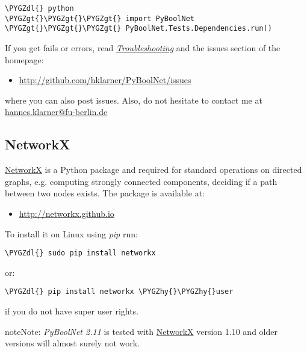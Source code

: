 \documentclass[letterpaper,10pt,english]{sphinxmanual}
\def\PYGZgt{\char`\>}
\def\PYGZdl{\char`\$}
\def\PYGZhy{\char`\-}
\begin{document}
\begin{Verbatim}[commandchars=\\\{\}]
\PYGZdl{} python
\PYGZgt{}\PYGZgt{}\PYGZgt{} import PyBoolNet
\PYGZgt{}\PYGZgt{}\PYGZgt{} PyBoolNet.Tests.Dependencies.run()
\end{Verbatim}

If you get fails or errors, read {\hyperref[Installation:installation-troubleshooting]{\emph{Troubleshooting}}} and the issues section of the homepage:
\begin{itemize}
\item {} 
\href{http://github.com/hklarner/PyBoolNet/issues}{http://github.com/hklarner/PyBoolNet/issues}

\end{itemize}

where you can also post issues. Also, do not hesitate to contact me at \href{mailto:hannes.klarner@fu-berlin.de}{hannes.klarner@fu-berlin.de}


\subsection{NetworkX}
\label{Installation:installation-networkx}\label{Installation:networkx}
\href{https://networkx.github.io/}{NetworkX} is a Python package and required for standard operations on directed graphs, e.g. computing strongly connected components,
deciding if a path between two nodes exists.
The package is available at:
\begin{itemize}
\item {} 
\href{http://networkx.github.io}{http://networkx.github.io}

\end{itemize}

To install it on Linux using \emph{pip} run:

\begin{Verbatim}[commandchars=\\\{\}]
\PYGZdl{} sudo pip install networkx
\end{Verbatim}

or:

\begin{Verbatim}[commandchars=\\\{\}]
\PYGZdl{} pip install networkx \PYGZhy{}\PYGZhy{}user
\end{Verbatim}

if you do not have super user rights.

\begin{notice}{note}{Note:}
\emph{PyBoolNet 2.11} is tested with \href{https://networkx.github.io/}{NetworkX} version 1.10 and older versions will almost surely not work.
\end{notice}
\end{document}
